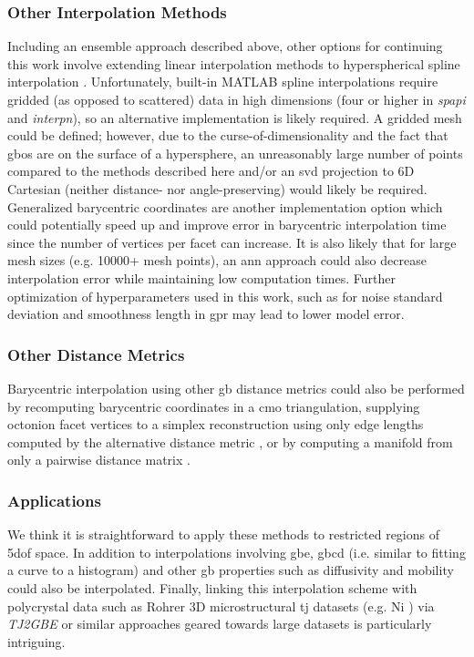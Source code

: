 \documentclass[preprint,12pt]{elsarticle}
\begin{document}
\subsubsection{Other Interpolation Methods}
Including an ensemble approach described above, other options for continuing this work involve extending linear interpolation methods to hyperspherical spline interpolation \cite{taijeronSplineInterpolationSmoothing1994}. Unfortunately, built-in MATLAB spline interpolations require gridded (as opposed to scattered) data in high dimensions (four or higher in \textit{spapi} and \textit{interpn}), so an alternative implementation is likely required. A gridded mesh could be defined; however, due to the curse-of-dimensionality and the fact that \glspl{gbo} are on the surface of a hypersphere, an unreasonably large number of points compared to the methods described here and/or an \gls{svd} projection to 6D Cartesian (neither distance- nor angle-preserving) would likely be required. Generalized barycentric coordinates \cite{floaterGeneralizedBarycentricCoordinates2015,meyerGeneralizedBarycentricCoordinates2002,langerSphericalBarycentricCoordinates2006} are another implementation option which could potentially speed up and improve error in barycentric interpolation time since the number of vertices per facet can increase. It is also likely that for large mesh sizes (e.g. \num{10000}+ mesh points), an \gls{ann} approach \cite{echeverrirestrepoUsingArtificialNeural2014} could also decrease interpolation error while maintaining low computation times. Further optimization of hyperparameters used in this work, such as for noise standard deviation and smoothness length in \gls{gpr} may lead to lower model error.

\subsubsection{Other  Distance Metrics}
Barycentric interpolation using other \gls{gb} distance metrics \cite{morawiecDistancesGrainInterfaces2019} could also be performed by recomputing barycentric coordinates in a \gls{cmo} triangulation, supplying octonion facet vertices to a simplex reconstruction using only edge lengths computed by the alternative distance metric \cite{connorHighdimensionalSimplexesSupermetric2017}, or by computing a manifold from only a pairwise distance matrix \cite{boissonnatOnlyDistancesAre2017}.

\subsubsection{Applications}
We think it is straightforward to apply these methods to restricted regions of \gls{5dof} space. In addition to interpolations involving \gls{gbe}, \gls{gbcd} (i.e. similar to fitting a curve to a histogram) and other \gls{gb} properties such as diffusivity and mobility could also be interpolated. Finally, linking this interpolation scheme with polycrystal data such as Rohrer 3D microstructural \gls{tj} datasets (e.g. Ni \cite{liRelativeGrainBoundary2009}) via \textit{TJ2GBE} \cite{shenDeterminingGrainBoundary2019} or similar approaches geared towards large datasets is particularly intriguing.
\end{document}
